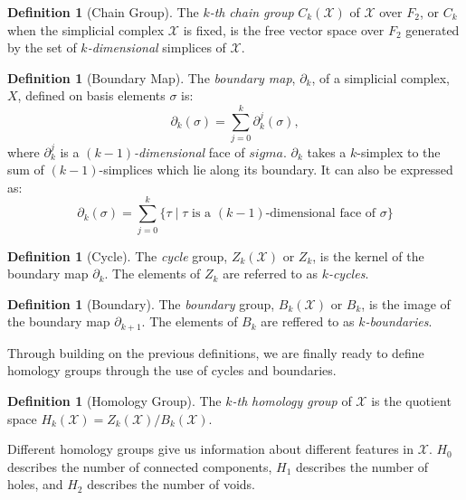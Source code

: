 \documentclass[ma]{uncgdissertationexp}
\theoremstyle{plain}
\theoremstyle{definition}
\newtheorem{definition}[theorem]{Definition}
\theoremstyle{remark}
\begin{document}
\begin{definition}[Chain Group]
\par The $k$\textit{-th} \textit{chain group} $C_k(\mathcal{X})$ of $\mathcal{X}$ over $F_2$, or $C_k$ when the simplicial complex $\mathcal{\mathcal{X}}$ is fixed, is the free vector space over $F_2$ generated by the set of $k$\textit{-dimensional} simplices of $\mathcal{X}$.
\end{definition}

\begin{definition}[Boundary Map]
\par The \textit{boundary map}, $\partial_{k}$, of a simplicial complex, $X$, defined on basis elements $\sigma$ is:
$$\partial_{k}(\sigma)=\sum^{k}_{j=0}\partial^{j}_{k}(\sigma),$$
where $\partial^{j}_{k}$ is a $(k-1)$\textit{-dimensional} face of $sigma$. $\partial_{k}$ takes a $k$-simplex to the sum of $(k-1)$-simplices which lie along its boundary. It can also be expressed as:
$$\partial_{k}(\sigma)=\sum^{k}_{j=0}\big\{\tau \mid \tau \text{ is a }(k-1)\text{-dimensional face of } \sigma \big\}$$
\end{definition}

\begin{definition}[Cycle]
\par The \textit{cycle} group, $Z_{k}(\mathcal{X})$ or $Z_k$, is the kernel of the boundary map $\partial_{k}$. The elements of $Z_k$ are referred to as $k$\textit{-cycles}.
\end{definition}

\begin{definition}[Boundary]
\par The \textit{boundary} group, $B_{k}(\mathcal{X})$ or $B_k$, is the image of the boundary map $\partial_{k+1}$. The elements of $B_k$ are reffered to as $k$\textit{-boundaries}.
\end{definition}

\par Through building on the previous definitions, we are finally ready to define homology groups through the use of cycles and boundaries.

\begin{definition}[Homology Group]
\par The $k$\textit{-th} \textit{homology group} of $\mathcal{X}$ is the quotient space $H_k(\mathcal{X}) = Z_{k}(\mathcal{X})/B_{k}(\mathcal{X})$.
\end{definition}

\par Different homology groups give us information about different features in $\mathcal{X}$. $H_{0}$ describes the number of connected components, $H_{1}$ describes the number of holes, and $H_{2}$ describes the number of voids.
\newpage
\end{document}

